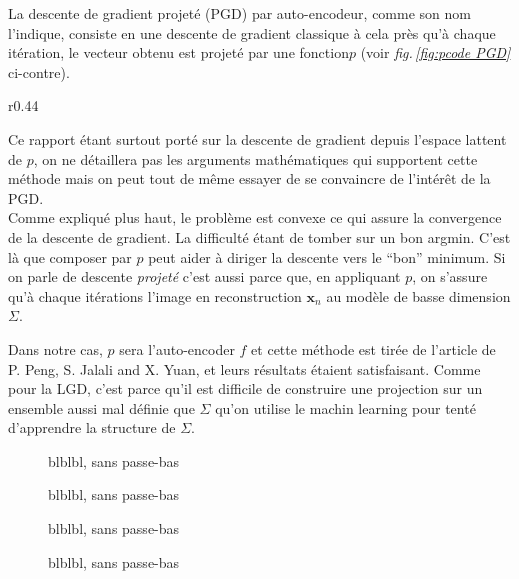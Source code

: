 \documentclass[hidelinks, french]{article} %
\renewcommand{\bf}[1]{\boldsymbol{#1}}
\newcommand{\figref}[1]{\textit{fig.\,\ref{#1}}}
\theoremstyle{enonce}
\theoremstyle{special}
\theoremstyle{rq}
\theoremstyle{exo}
\theoremstyle{demo}
\begin{document}
La descente de gradient projeté (PGD) par auto-encodeur, comme son nom l'indique, consiste en une descente de gradient classique à cela près qu'à chaque itération, le vecteur obtenu est projeté par une fonction$p$ (voir \figref{fig:pcode PGD} ci-contre). 

\begin{wrapfigure}[17]{r}{0.44\textwidth}
    
    \caption{Algorithme de PGD}
    \label{fig:pcode PGD}
\end{wrapfigure}
\noindent Ce rapport étant surtout porté sur la descente de gradient depuis l'espace lattent de $p$, on ne détaillera pas les arguments mathématiques qui supportent cette méthode mais on peut tout de même essayer de se convaincre de l'intérêt de la PGD.\\
Comme expliqué plus haut, le problème est convexe ce qui assure la convergence de la descente de gradient. La difficulté étant de tomber sur un bon argmin. C'est là que composer par $p$ peut aider à diriger la descente vers le ``bon'' minimum. Si on parle de descente \emph{projeté} c'est aussi parce que, en appliquant $p$, on s'assure qu'à chaque itérations l'image en reconstruction $\bf{x}_n$ au modèle de basse dimension $\Sigma$.

Dans notre cas, $p$ sera l'auto-encoder $f$ et cette méthode est tirée de l'article \cite{peng_solving_2019} de P. Peng, S. Jalali and X. Yuan, et leurs résultats étaient satisfaisant. Comme pour la LGD, c'est parce qu'il est difficile de construire une projection sur un ensemble aussi mal définie que $\Sigma$ qu'on utilise le machin learning pour tenté d'apprendre la structure de $\Sigma$.
\\

\begin{figure}[H]\centering
	
	\caption{blblbl, sans passe-bas}
	\label{fig:PGD}
\end{figure}

\begin{figure}[H]\centering
	
	\caption{blblbl, sans passe-bas}
	\label{fig:PGD}
\end{figure}

\begin{figure}[H]\centering
	
	\caption{blblbl, sans passe-bas}
	\label{fig:PGD}
\end{figure}

\begin{figure}[H]\centering
	
	\caption{blblbl, sans passe-bas}
	\label{fig:PGD}
\end{figure}
\end{document}
